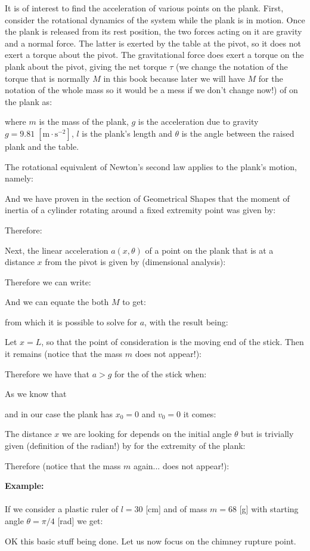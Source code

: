 	It is of interest to find the acceleration of various points on the plank. First, consider the rotational dynamics of the system while the plank is in motion. Once the plank is released from its rest position, the two forces acting on it are gravity and a normal force. The latter is exerted by the table at the pivot, so it does not exert a torque about the pivot. The gravitational force does exert a torque on the plank about the pivot, giving the net torque $\tau$ (we change the notation of the torque that is normally $M$ in this book because later we will have $M$ for the notation of the whole mass so it would be a mess if we don't change now!) of on the plank as:
		
	where $m$ is the mass of the plank, $g$ is the acceleration due to gravity $g = 9.81\;[\text{m}\cdot \text{s}^{-2}]$, $l$ is the plank's length and $\theta$ is the angle between the raised plank and the table.
	
	The rotational equivalent of Newton's second law applies to the plank’s motion, namely:
	
	And we have proven in the section of Geometrical Shapes that the moment of inertia of a cylinder rotating around a fixed extremity point was given by:
	
	Therefore:
	
	Next, the linear acceleration $a(x,\theta)$ of a point on the plank that is at a distance $x$ from the pivot is given by (dimensional analysis):
	
	Therefore we can write:
	
	And we can equate the both $M$ to get:
	
	from which it is possible to solve for $a$, with the result being:
	
	Let $x = L$, so that the point of consideration is the moving end of the stick. Then it remains (notice that the mass $m$ does not appear!):
	
	Therefore we have that $a>g$ for the of the stick when:
	
	As we know that
	
	and in our case the plank has $x_0=0$ and $v_0=0$ it comes:
	
	The distance $x$ we are looking for depends on the initial angle $\theta$ but is trivially given (definition of the radian!) by for the extremity of the plank:
	
	Therefore (notice that the mass $m$ again... does not appear!):
	
	\begin{tcolorbox}[colframe=black,colback=white,sharp corners]
	\textbf{{\Large {}}Example:}\\\\
	If we consider a plastic ruler of $l=30$ [cm] and of mass $m= 68$ [g] with starting angle $\theta=\pi/4$ [rad] we get:
	
	\end{tcolorbox}
	OK this basic stuff being done. Let us now focus on the chimney rupture point.
	
